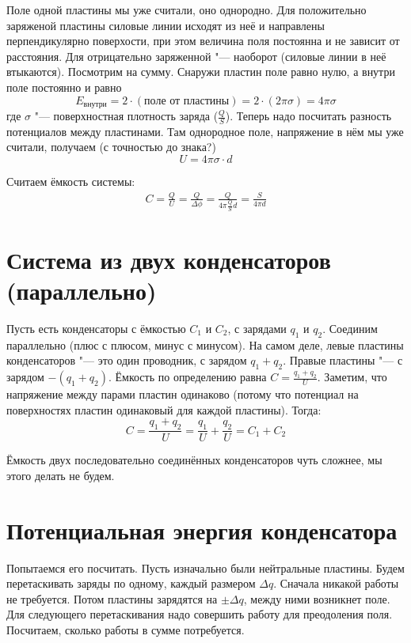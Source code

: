   Поле одной пластины мы уже считали, оно однородно.
  Для положительно заряженой пластины силовые линии исходят из неё и направлены перпендикулярно поверхости,
  при этом величина поля постоянна и не зависит от расстояния.
  Для отрицательно заряженной "--- наоборот (силовые линии в неё втыкаются).
  Посмотрим на сумму.
  Снаружи пластин поле равно нулю, а внутри поле постоянно и равно
  \[E_{\text{внутри}} = 2\cdot(\text{поле от пластины}) = 2\cdot(2\pi \sigma) = 4\pi\sigma\]
  где $\sigma$ "--- поверхностная плотность заряда ($\frac Q S$).
  Теперь надо посчитать разность потенциалов между пластинами.
  Там однородное поле, напряжение в нём мы уже считали, получаем (с точностью до знака?)
  \[U = 4\pi\sigma \cdot d\]

  Считаем ёмкость системы:
  \begin{gather*}
  C = \frac Q U = \frac Q {\Delta \phi} = \frac Q {4 \pi \frac{Q}{S} d} = \frac{S}{4\pi d}
  \end{gather*}

\section{Система из двух конденсаторов (параллельно)}
  Пусть есть конденсаторы с ёмкостью $C_1$ и $C_2$, с зарядами $q_1$ и $q_2$.
  Соединим параллельно (плюс с плюсом, минус с минусом).
  На самом деле, левые пластины конденсаторов "--- это один проводник, с зарядом $q_1+q_2$.
  Правые пластины "--- с зарядом $-(q_1+q_2)$.
  Ёмкость по определению равна $C = \frac{q_1+q_2}{U}$.
  Заметим, что напряжение между парами пластин одинаково
  (потому что потенциал на поверхностях пластин одинаковый для каждой пластины).
  Тогда:
  \[ C = \frac{q_1 + q_2}{U} = \frac{q_1}{U} + \frac{q_2}{U} = C_1+C_2\]
  \begin{Rem}
  Ёмкость двух последовательно соединённых конденсаторов чуть сложнее, мы этого делать не будем.
  \end{Rem}

\section{Потенциальная энергия конденсатора}
  Попытаемся его посчитать.
  Пусть изначально были нейтральные пластины.
  Будем перетаскивать заряды по одному, каждый размером $\Delta q$.
  Сначала никакой работы не требуется.
  Потом пластины зарядятся на $\pm \Delta q$, между ними возникнет поле.
  Для следующего перетаскивания надо совершить работу для преодоления поля.
  Посчитаем, сколько работы в сумме потребуется.

